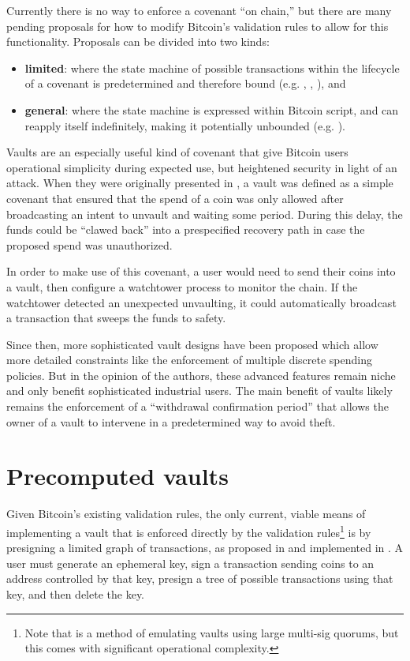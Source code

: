 \documentclass[10pt]{article}
\begin{document}
Currently there is no way to enforce a covenant ``on chain,'' but there are many
pending proposals for how to modify Bitcoin's validation rules to allow for this
functionality. Proposals can be divided into two kinds:

\begin{itemize}
  \item \textbf{limited}: where the state machine of possible transactions within the lifecycle
    of a covenant is predetermined and therefore bound (e.g. \cite{CTV}, \cite{APO},
    \cite{OPTX}), and

  \item \textbf{general}: where the state machine is expressed within Bitcoin script,
    and can reapply itself indefinitely, making it potentially unbounded (e.g. \cite{ElementsScript}).

\end{itemize}

Vaults are an especially useful kind of covenant that give Bitcoin users
operational simplicity during expected use, but heightened security in light of an
attack. When they were originally presented in \cite{Cov}, a vault was defined as a
simple covenant that ensured that the spend of a coin was only allowed after
broadcasting an intent to unvault and waiting some period. During this delay,
the funds could be ``clawed back'' into a prespecified recovery path in case the
proposed spend was unauthorized.

In order to make use of this covenant, a user would need to send their coins into a
vault, then configure a watchtower process to monitor the chain. If the watchtower
detected an unexpected unvaulting, it could automatically broadcast a transaction that
sweeps the funds to safety.

Since then, more sophisticated vault designs have been proposed which allow more
detailed constraints like the enforcement of multiple discrete spending
policies. But in the opinion of the authors, these advanced features remain niche and
only benefit sophisticated industrial users. The main benefit of vaults 
likely remains the enforcement of a ``withdrawal confirmation period'' that
allows the owner of a vault to intervene in a predetermined way to avoid theft.


\section*{Precomputed vaults}

Given Bitcoin's existing validation rules, the only current, viable means of
implementing a vault that is enforced directly by the validation rules\footnote{Note
that \cite{Revault} is a method of emulating vaults using large multi-sig quorums, but
this comes with significant operational complexity.} is by presigning a limited graph
of transactions, as proposed in \cite{Bishop} and implemented in \cite{BishopCode}. A user must generate an ephemeral key,
sign a transaction sending coins to an address controlled by that key, presign a
tree of possible transactions using that key, and then delete the key. 
\end{document}
